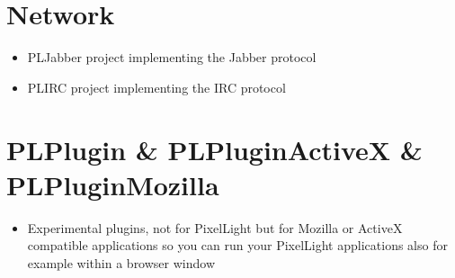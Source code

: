 \section{Network}
\begin{itemize}
\item{PLJabber project implementing the Jabber protocol}
\item{PLIRC project implementing the IRC protocol}
\end{itemize}




\section{PLPlugin \& PLPluginActiveX \& PLPluginMozilla}
\begin{itemize}
\item{Experimental plugins, not for PixelLight but for Mozilla or ActiveX compatible applications so you can run your PixelLight applications also for example within a browser window}
\end{itemize}
